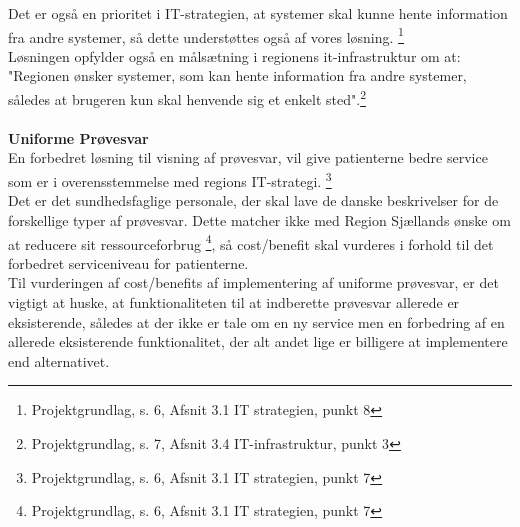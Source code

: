 Det er også en prioritet i IT-strategien, at systemer skal kunne hente information fra andre systemer, så dette understøttes også af vores løsning. \footnote{Projektgrundlag, s. 6, Afsnit 3.1 IT strategien, punkt 8} \\
Løsningen opfylder også en målsætning i regionens it-infrastruktur om at: "Regionen ønsker systemer, som kan hente information fra andre systemer, således at brugeren kun skal henvende sig et enkelt sted".\footnote{Projektgrundlag, s. 7, Afsnit 3.4 IT-infrastruktur, punkt 3}
\\\\
\textbf{Uniforme Prøvesvar}\\ %
En forbedret løsning til visning af prøvesvar, vil give patienterne bedre service som er i overensstemmelse med regions IT-strategi. \footnote{Projektgrundlag, s. 6, Afsnit 3.1 IT strategien, punkt 7}\\
Det er det sundhedsfaglige personale, der skal lave de danske beskrivelser for de forskellige typer af prøvesvar. Dette matcher ikke med Region Sjællands ønske om at reducere sit ressourceforbrug \footnote{Projektgrundlag, s. 6, Afsnit 3.1 IT strategien, punkt 7}, så cost/benefit skal vurderes i forhold til det forbedret serviceniveau for patienterne.\\
Til vurderingen af cost/benefits af implementering af uniforme prøvesvar, er det vigtigt at huske, at funktionaliteten til at indberette prøvesvar allerede er eksisterende, således at der ikke er tale om en ny service men en forbedring af en allerede eksisterende funktionalitet, der alt andet lige er billigere at implementere end alternativet.
